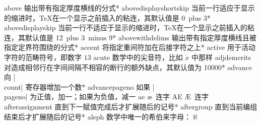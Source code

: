 \capcs above {输出带有指定厚度横线的分式}*{}
\capcs abovedisplayshortskip {当前一行适应于显示的缩进时，\TeX 在一个显示之前插入的粘连，其默认值是 0\pt\ plus 3\pt}*{}%
\capcs abovedisplayskip {当前一行不适应于显示的缩进时，\TeX 在一个显示之前插入的粘连，其默认值是 12\pt\ plus 3\pt\ minus 9\pt}*{}%
\capcs abovewithdelims {输出带有指定厚度横线且被指定定界符围绕的分式}*{}
\capcs accent {将指定重间符加在后接字符之上}*{}
\capcs active {用于活动字符的范畴符号，即数字 $13$}{}{}%
\capcs acute {数学中的尖音符，比如 $\acute x$ 中那样}{}{}
\capcs adjdemerits {对造成相邻行在字间间隔不相容的断行的额外缺点，其默认值为 10000}*{}%
\capcs advance {向 |\\count| 寄存器增加一个数}*{}
\capcs advancepageno {如果 |\\pageno| 为正值，加一；如果为负值，减一}{}{}
\capcs ae {\ae\ 连字}{}{}
\capcs AE {\AE\ 连字}{}{}
\capcs afterassignment {直到下一赋值完成后才扩展随后的记号}*{}
\capcs aftergroup {直到当前编组结束后才扩展随后的记号}*{}
\capcs aleph {数学中唯一的希伯来字母：$\aleph$}{}{}
